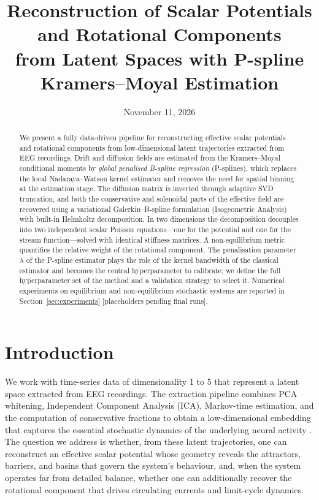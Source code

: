 \documentclass[11pt,a4paper]{article}
\title{Reconstruction of Scalar Potentials and Rotational Components\\
from Latent Spaces with P-spline Kramers--Moyal Estimation}
\author{}
\date{November 11, 2026}
\begin{document}
\maketitle

\begin{abstract}
We present a fully data-driven pipeline for reconstructing effective scalar
potentials and rotational components from low-dimensional latent trajectories
extracted from EEG recordings. Drift and diffusion fields are estimated from
the Kramers--Moyal conditional moments by \emph{global penalised B-spline
regression} (P-splines), which replaces the local Nadaraya--Watson kernel
estimator and removes the need for spatial binning at the estimation stage.
The diffusion matrix is inverted through adaptive SVD truncation, and both the
conservative and solenoidal parts of the effective field are recovered using a
variational Galerkin--B-spline formulation (Isogeometric Analysis) with
built-in Helmholtz decomposition. In two dimensions the decomposition decouples
into two independent scalar Poisson equations---one for the potential and one
for the stream function---solved with identical stiffness matrices. A
non-equilibrium metric quantifies the relative weight of the rotational
component. The penalisation parameter $\lambda$ of the P-spline estimator plays
the role of the kernel bandwidth of the classical estimator and becomes the
central hyperparameter to calibrate; we define the full hyperparameter set of
the method and a validation strategy to select it. Numerical experiments on
equilibrium and non-equilibrium stochastic systems are reported in
Section~\ref{sec:experiments} [placeholders pending final runs].
\end{abstract}

\tableofcontents
\newpage

\section{Introduction}

We work with time-series data of dimensionality 1 to 5 that represent a latent
space extracted from EEG recordings. The extraction pipeline combines PCA
whitening, Independent Component Analysis (ICA), Markov-time estimation, and
the computation of conservative fractions to obtain a low-dimensional embedding
that captures the essential stochastic dynamics of the underlying neural
activity \cite{tabar2019}. The question we address is whether, from these
latent trajectories, one can reconstruct an effective scalar potential whose
geometry reveals the attractors, barriers, and basins that govern the system's
behaviour, and, when the system operates far from detailed balance, whether one
can additionally recover the rotational component that drives circulating
currents and limit-cycle dynamics.
\end{document}
